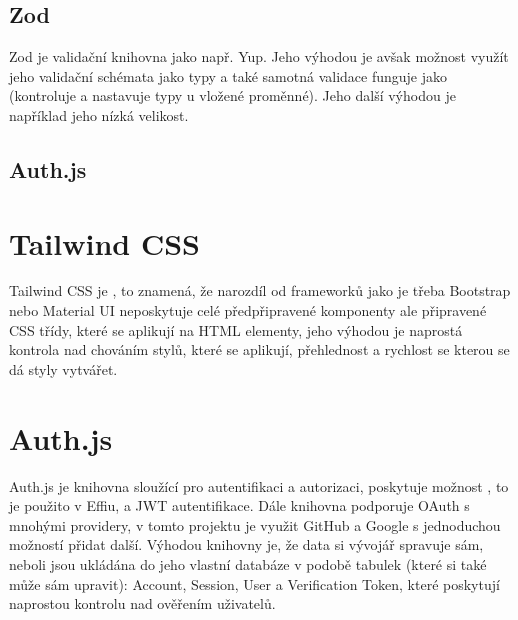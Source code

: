 \documentclass[12pt, a4paper,
openright
]{report}
\begin{document}
\subsection{Zod}
Zod je validační knihovna jako např. Yup. Jeho výhodou je avšak možnost využít jeho validační schémata jako typy a také samotná validace funguje jako  (kontroluje a nastavuje typy u vložené proměnné). Jeho další výhodou je například jeho nízká velikost.

\subsection{Auth.js}
\section{Tailwind CSS}
Tailwind CSS je , to znamená, že narozdíl od frameworků jako je třeba Bootstrap nebo Material UI neposkytuje celé předpřipravené komponenty ale připravené CSS třídy, které se aplikují na HTML elementy, jeho výhodou je naprostá kontrola nad chováním stylů, které se aplikují, přehlednost a rychlost se kterou se dá styly vytvářet.

\section{Auth.js}
Auth.js je knihovna sloužící pro autentifikaci a autorizaci, poskytuje možnost , to je použito v Effiu, a JWT autentifikace. Dále knihovna podporuje OAuth s mnohými providery, v tomto projektu je využit GitHub a Google s jednoduchou možností přidat další. Výhodou knihovny je, že data si vývojář spravuje sám, neboli jsou ukládána do jeho vlastní databáze v podobě tabulek (které si také může sám upravit): Account, Session, User a Verification Token, které poskytují naprostou kontrolu nad ověřením uživatelů.

\end{document}
